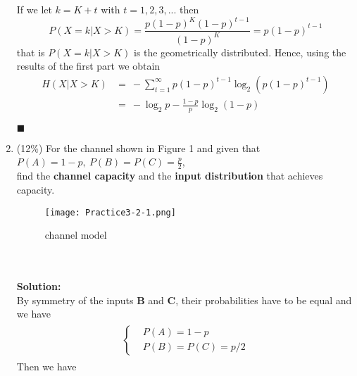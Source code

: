 \documentclass[a4paper,12pt]{article}
\begin{document}
\begin{enumerate}
            If we let $k = K + t$ with $t = 1, 2, 3, ...$ then $$P(X = k | X > K) = \frac{p(1 - p)^K (1 - p)^{t - 1}}{(1 - p)^K} = p(1 - p)^{t - 1}$$
            that is $P(X = k | X > K)$ is the geometrically distributed. Hence, using the results of the first part we obtain 
            \begin{align*}
                H(X | X > K) &= \ - \sum_{t = 1}^{\infty} p(1 - p)^{t - 1} \log_2 \left( p(1 - p)^{t - 1} \right) \\
                             &= \ - \log_2 p - \frac{1 - p}{p} \log_2 \left(1 - p\right)
            \end{align*}
            \begin{flushright}
                $\blacksquare$
            \end{flushright}
        \item (12\%)
            For the channel shown in Figure 1 and given that $P(A) = 1 - p, \ P(B) = P(C) = \frac{p}{2}$, \\
            find the \textbf{channel capacity} and the \textbf{input distribution} that achieves capacity. 
            \begin{figure}[h]
                \centering
                \texttt{[image: Practice3-2-1.png]}
                \caption{channel model}
            \end{figure} \\ \\ 
            \textbf{Solution:} \\
            By symmetry of the inputs \textbf{B} and \textbf{C}, their probabilities have to be equal and we have 
            \begin{align*}
                \begin{aligned}
                    \left\{
                    \begin{aligned}
                        & P(A) = 1 - p \\
                        & P(B) = P(C) = p/2
                    \end{aligned}
                    \right.
                \end{aligned}
            \end{align*}
            Then we have 
            \begin{align*}
                \begin{aligned}

\end{aligned}
\end{align*}
\end{enumerate}
\end{document}
